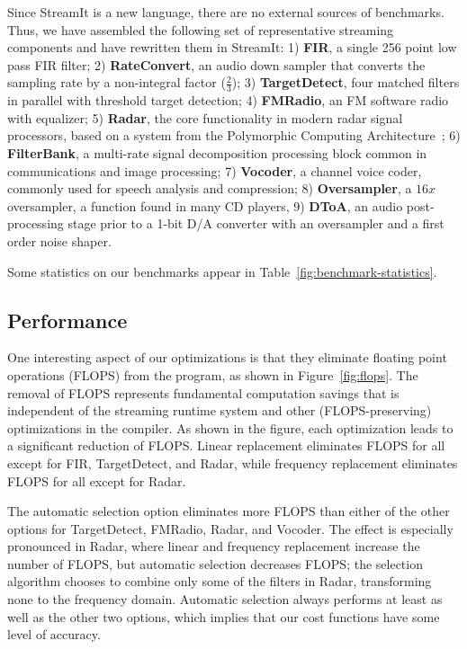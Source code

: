 \documentclass{sig-alternate}
\begin{document}
{Since StreamIt is a new language, there are no external sources of
benchmarks.  Thus, we have assembled the following set of
representative streaming components and have rewritten them in
StreamIt: 1) {\bf FIR}, a single 256 point low pass FIR filter; 2)
{\bf RateConvert}, an audio down sampler that converts the sampling
rate by a non-integral factor ($\frac{2}{3}$); 3) {\bf TargetDetect},
four matched filters in parallel with threshold target detection; 4)
{\bf FMRadio}, an FM software radio with equalizer; 5) {\bf Radar},
the core functionality in modern radar signal processors, based on a
system from the Polymorphic Computing Architecture~\cite{pca}; 6) {\bf
FilterBank}, a multi-rate signal decomposition processing block common
in communications and image processing; 7) {\bf Vocoder}, a channel
voice coder, commonly used for speech analysis and compression; 8)
{\bf Oversampler}, a $16x$ oversampler, a function found in many CD
players, 9) {\bf DToA}, an audio post-processing stage prior to a
1-bit D/A converter with an oversampler and a first order noise
shaper.

Some statistics on our benchmarks appear in
Table~\ref{fig:benchmark-statistics}.

\subsection{Performance}

One interesting aspect of our optimizations is that they eliminate
floating point operations (FLOPS) from the program, as shown in
Figure~\ref{fig:flops}.  The removal of FLOPS represents fundamental
computation savings that is independent of the streaming runtime
system and other (FLOPS-preserving) optimizations in the compiler.  As
shown in the figure, each optimization leads to a significant
reduction of FLOPS.  Linear replacement eliminates FLOPS for all
except for FIR, TargetDetect, and Radar, while frequency replacement
eliminates FLOPS for all except for Radar.

The automatic selection option eliminates more FLOPS than either of
the other options for TargetDetect, FMRadio, Radar, and Vocoder.  The
effect is especially pronounced in Radar, where linear and frequency
replacement increase the number of FLOPS, but automatic selection
decreases FLOPS; the selection algorithm chooses to combine only some
of the filters in Radar, transforming none to the frequency domain.
Automatic selection always performs at least as well as the other two
options, which implies that our cost functions have some level of
accuracy.

}
\end{document}
